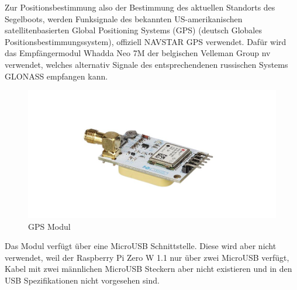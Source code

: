 Zur Positionsbestimmung also der Bestimmung des aktuellen Standorts des Segelboots, werden Funksignale des bekannten US-amerikanischen satellitenbasierten Global Positioning Systems (GPS) (deutsch Globales Positionsbestimmungssystem), offiziell NAVSTAR GPS verwendet. Dafür wird das Empfängermodul Whadda Neo 7M der belgischen Velleman Group nv verwendet, welches alternativ Signale des entsprechendenen russischen Systems GLONASS empfangen kann. 
\begin{figure}[H] 
    \centering
    \includegraphics[width=1\linewidth]{gps.png}
    \caption{GPS Modul}
    \label{fig:gps}
\end{figure}
Das Modul verfügt über eine MicroUSB Schnittstelle. Diese wird aber nicht verwendet, weil der Raspberry Pi Zero W 1.1 nur über zwei MicroUSB verfügt, Kabel mit zwei männlichen MicroUSB Steckern aber nicht existieren und in den USB Spezifikationen nicht vorgesehen sind. 

